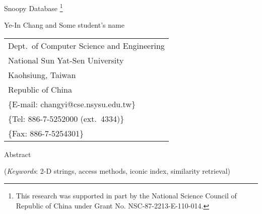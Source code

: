 %
%

\voffset -1cm
\hoffset -0.5in
\textheight 8.7in
\textwidth 6.4in
\setlength{\baselineskip}{5ex}
\setlength{\parskip}{0pt}
\setlength{\parindent}{0cm}



\begin{titlepage}
\addtolength{\textwidth}{+.1\textwidth}
\begin{center}
{\bf



{\LARGE Snoopy Database}
\footnote[1]{This research was supported in part by the National
Science Council of Republic of China under Grant No.
NSC-87-2213-E-110-014.} }



\vspace{0.5cm}

Ye-In Chang and Some student's name

\vspace{0.5cm}



\begin{tabular}{l}
\setlength{\baselineskip}{18pt}
Dept.~of Computer Science and Engineering\\
\hspace{1.1cm}National Sun Yat-Sen University\\
\hspace{2.7cm} Kaohsiung, Taiwan \\
\hspace{2.9cm}Republic of China \\
\hspace{0.6cm}\{E-mail: changyi@cse.nsysu.edu.tw\}\\
\hspace{1cm} \{Tel: 886-7-5252000 (ext.~4334)\}\\
 \hspace{2.3cm}\{Fax: 886-7-5254301\}\\
\end{tabular}

\end{center}



\begin{center}
{\large Abstract}
\end{center}


\vspace{1cm}
\noindent



({\em Keywords}: 2-D strings, access methods, iconic index, similarity retrieval)

\end{titlepage}
